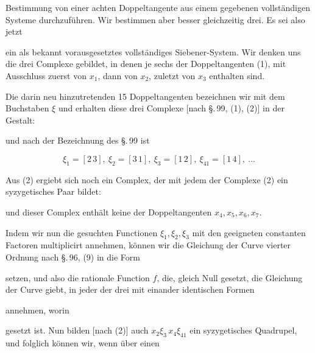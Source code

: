 Bestimmung von einer achten Doppeltangente aus einem gegebenen vollständigen Systeme durchzuführen. Wir bestimmen aber besser gleichzeitig drei. Es sei also jetzt


ein als bekannt vorausgesetztes vollständiges Siebener-System. Wir denken uns die drei  Complexe gebildet, in denen je sechs der Doppeltangenten (1), mit Ausschluss zuerst von $x_1$, dann von $x_2$, zuletzt von $x_3$ enthalten sind.

Die darin neu hinzutretenden 15 Doppeltangenten bezeichnen wir mit dem Buchstaben $\xi$ und erhalten diese drei Complexe [nach \S.\,99, (1), (2)] in der Gestalt:


und nach der Bezeichnung des \S.\,99 ist

\[
\xi_1 = [2\,3],\ \xi_2 = [3\,1],\ \xi_3 = [1\,2],\ \xi_{41} = [1\,4],\ \ldots
\]

Aus (2) ergiebt sich noch ein  Complex, der mit jedem der Complexe (2) ein syzygetisches Paar bildet:


und dieser Complex enthält keine der Doppeltangenten $x_4, x_5, x_6, x_7$.

Indem wir nun die gesuchten Functionen $\xi_1, \xi_2, \xi_3$ mit den geeigneten constanten Factoren multiplicirt annehmen, können wir die Gleichung der Curve vierter Ordnung nach \S.\,96, (9) in die Form


setzen, und also die rationale Function $f$, die, gleich Null gesetzt, die Gleichung der Curve giebt, in jeder der drei mit einander identischen Formen


annehmen, worin


gesetzt ist. Nun bilden [nach (2)] auch $x_2\xi_3\, x_4\xi_{41}$ ein syzygetisches Quadrupel, und folglich können wir, wenn über einen
